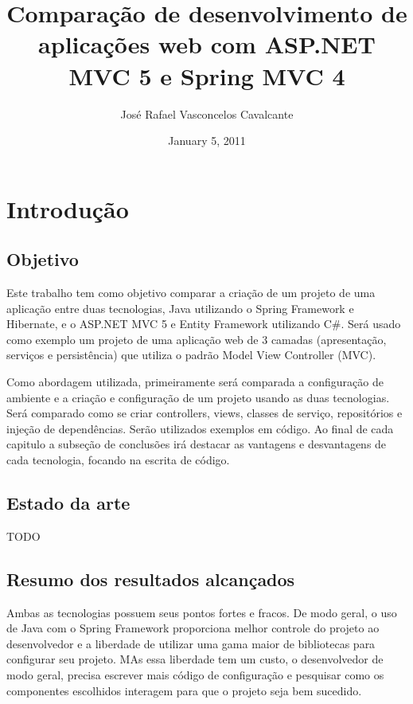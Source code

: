 \documentclass[a4paper,12pt]{article}
\begin{document}
\title{Comparação de desenvolvimento de aplicações web com ASP.NET MVC 5 e Spring MVC 4}
\author{José Rafael Vasconcelos Cavalcante}
\date{January 5, 2011}
\maketitle

\newpage
\section{Introdução}

\subsection{Objetivo}
Este trabalho tem como objetivo comparar a criação de um projeto de uma aplicação entre duas tecnologias, Java utilizando o Spring Framework e Hibernate, e o ASP.NET MVC 5 e Entity Framework utilizando C\#. Será usado como exemplo um projeto de uma aplicação web de 3 camadas (apresentação, serviços e persistência) que utiliza o padrão Model View Controller (MVC).

Como abordagem utilizada, primeiramente será comparada a configuração de ambiente e a criação e configuração de um projeto usando as duas tecnologias. Será comparado como se criar controllers, views, classes de serviço, repositórios e injeção de dependências. Serão utilizados exemplos em código. Ao final de cada capitulo a subseção de conclusões irá destacar as vantagens e desvantagens de cada tecnologia, focando na escrita de código.

\subsection{Estado da arte}

TODO

\subsection{Resumo dos resultados alcançados}

Ambas as tecnologias possuem seus pontos fortes e fracos. De modo geral, o uso de Java com o Spring Framework proporciona melhor controle do projeto ao desenvolvedor e a liberdade de utilizar uma gama maior de bibliotecas para configurar seu projeto. MAs essa liberdade tem um custo, o desenvolvedor de modo geral, precisa escrever mais código de configuração e pesquisar como os componentes escolhidos interagem para que o projeto seja bem sucedido.
\end{document}
